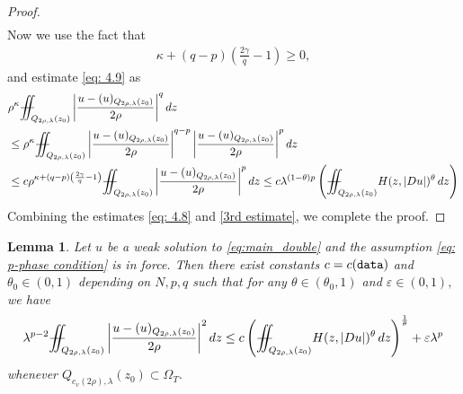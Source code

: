 \documentclass[notitlepage,11pt,reqno]{amsart}
\newtheorem{lemma}[theorem]{Lemma}
\theoremstyle{definition}
\numberwithin{equation}{section}
\newcommand{\iintss}{{\int\hspace{-0.28cm}\int}}
\newcommand{ \miints }{{\iintss\hspace{-0.56cm} -\hspace{-0.15cm}-}}
\newcommand{\miint}[1]{{\miints_{\hspace{-0.13cm}#1}}}
\begin{document}
\begin{proof}
\begin{align}
\end{align}
Now we use the fact that
\begin{align*}
    \kappa + (q-p)\left(\frac{2\gamma}{q}-1\right)\geq 0,
\end{align*}
and estimate \eqref{eq: 4.9} as
\begin{align}\label{3rd estimate}
&\rho^{\kappa}\miint{Q_{2\rho, \lambda}(z_0)} \left|\frac{u-(u)_{Q_{2\rho, \lambda}(z_0)}}{2\rho}\right|^q dz\nonumber\\
&\leq \rho^{\kappa}\miint{Q_{2\rho, \lambda}(z_0)}\left|\frac{u-(u)_{Q_{2\rho, \lambda}(z_0)}}{2\rho}\right|^{q-p}\left|\frac{u-(u)_{Q_{2\rho, \lambda}(z_0)}}{2\rho}\right|^p dz\nonumber\\
&\leq c \rho^{ \kappa + (q-p)\left(\frac{2\gamma}{q}-1\right)}\miint{Q_{2\rho, \lambda}(z_0)}\left|\frac{u-(u)_{Q_{2\rho, \lambda}(z_0)}}{2\rho}\right|^p dz\leq c \lambda^{(1-\theta)p}\left(\miint{Q_{2\rho, \lambda}(z_0)} H(z, |Du|)^{\theta}\, dz\right)
\end{align}
Combining the estimates \eqref{eq: 4.8} and \eqref{3rd estimate}, we complete the proof.
\end{proof}
\begin{lemma}\label{LEM5.3}
Let $u$ be a weak solution to \eqref{eq:main_double} and the assumption \ref{eq: p-phase condition} is in force. Then there exist constants $c=c(\textnormal{\texttt{data}})$ and $\theta_0 \in (0,1)$ depending on $N,p,q$ such that for any $\theta\in (\theta_0,1)$ and $\varepsilon \in (0, 1),$ we have
\begin{align*}
\lambda^{p-2} \miint{Q_{2\rho, \lambda}(z_0)}\left|\frac{u-(u)_{Q_{2\rho, \lambda}(z_0)}}{2\rho}\right|^2 dz \leq  c \left(\miint{Q_{2\rho, \lambda}(z_0)}H(z, |D u|)^{\theta}\, dz\right)^{\frac{1}{\theta}}+\varepsilon \lambda^{p}    
\end{align*}
whenever $Q_{c_v(2\rho), \lambda}(z_0)\subset \Omega_T.$
\end{lemma}
\end{document}
